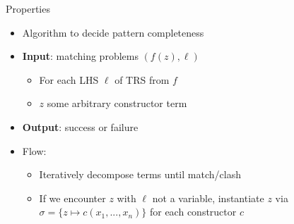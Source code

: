 \begin{frame}{Properties}
\begin{itemize}
    \item Algorithm to decide pattern completeness
    \item \textbf{Input}: matching problems $(f(z), \ell)$
    \begin{itemize}
        \item For each LHS $\ell$ of TRS from $f$
        \item $z$ some arbitrary constructor term
    \end{itemize}
    \item \textbf{Output}: success or failure
    \item Flow: 
    \begin{itemize}
        \item Iteratively decompose terms until match/clash
        \item If we encounter $z$ with $\ell$ not a variable, instantiate $z$ via $\sigma = \{z \mapsto c(x_1, ..., x_n) \}$ for each constructor $c$
    \end{itemize}
\end{itemize}


\end{frame}


